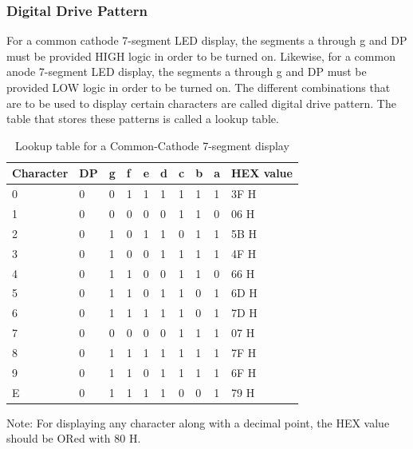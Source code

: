 \documentclass{lab_sheet}
\newcommand{\digitalpattern}[1]{
    \begin{tabular}{C{2cm}C{1cm}C{1cm}C{1cm}C{1cm}C{1cm}C{1cm}C{1cm}C{1cm}C{2cm}}
        \toprule
          Character & DP & g & f & e & d & c & b & a & HEX value\\
          \midrule
          #1
          \bottomrule
       \end{tabular}
}
\begin{document}
    \subsubsection{Digital Drive Pattern}
    For a common cathode 7-segment LED display, the segments a through g and DP must be provided HIGH logic in order to be turned on. Likewise, for a common anode 7-segment LED display, the segments a through g and DP must be provided LOW logic in order to be turned on. The different combinations that are to be used to display certain characters are called digital drive pattern. The table that stores these patterns is called a lookup table.
    \begin{table}[H]
        \centering
        \begin{threeparttable}
        \digitalpattern{0 & 0 & 0 & 1 & 1 & 1 & 1 & 1 & 1 & 3F H\\
        1 & 0 & 0 & 0 & 0 & 0 & 1 & 1 & 0 & 06 H\\
        2 & 0 & 1 & 0 & 1 & 1 & 0 & 1 & 1 & 5B H\\
        3 & 0 & 1 & 0 & 0 & 1 & 1 & 1 & 1 & 4F H\\
        4 & 0 & 1 & 1 & 0 & 0 & 1 & 1 & 0 & 66 H\\
        5 & 0 & 1 & 1 & 0 & 1 & 1 & 0 & 1 & 6D H\\
        6 & 0 & 1 & 1 & 1 & 1 & 1 & 0 & 1 & 7D H\\
        7 & 0 & 0 & 0 & 0 & 0 & 1 & 1 & 1 & 07 H\\
        8 & 0 & 1 & 1 & 1 & 1 & 1 & 1 & 1 & 7F H\\
        9 & 0 & 1 & 1 & 0 & 1 & 1 & 1 & 1 & 6F H\\
        E & 0 & 1 & 1 & 1 & 1 & 0 & 0 & 1 & 79 H\\}
  \begin{tablenotes}
    \small
    \item Note: For displaying any character along with a decimal point, the HEX value should be ORed with 80 H.
  \end{tablenotes}
  \caption{Lookup table for a Common-Cathode 7-segment display}
  \label{tbl:cc}
        \end{threeparttable}
    \end{table}
\end{document}

